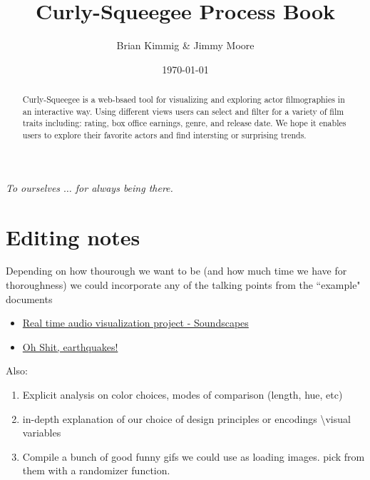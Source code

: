 \documentclass[12pt]{article}
\title{Curly-Squeegee Process Book}
\author{ Brian Kimmig \& Jimmy Moore}
\date{\today}
\begin{document}
\maketitle

\begin{abstract}
	Curly-Squeegee is a web-bsaed tool for visualizing and exploring actor filmographies in an interactive way. Using different views users can select and filter for a variety of film traits including: rating, box office earnings, genre, and release date.  We hope it enables users to explore their favorite actors and find intersting or surprising trends.
\end{abstract}

\newpage

\tableofcontents

\newpage


\begin{center}

	\vspace*{\fill}
	\textit{To ourselves $\dots$ for always being there.}
	\vspace*{\fill}
	
\end{center}

\newpage 

\section{Editing notes}

{\color{red}

Depending on how thourough we want to be (and how much time we have for thoroughness) we could incorporate any of the talking points from the ``example" documents
\begin{itemize}
	\item \href{http://dataviscourse.net/2015/assets/process_books/bansal_cao_hou.pdf}{Real time audio visualization project - Soundscapes}
	\item \href{http://dataviscourse.net/2015/assets/process_books/walsh_trevino_bett.pdf}{Oh Shit, earthquakes!}

\end{itemize}

Also:
\begin{enumerate}
	\item Explicit analysis on color choices, modes of comparison (length, hue, etc)
	\item in-depth explanation of our  choice of design principles or encodings \textbackslash visual variables
		\item Compile a bunch of good funny gifs we could use as loading images.  pick from them with a randomizer function.
	
\end{enumerate}
}
\end{document}
